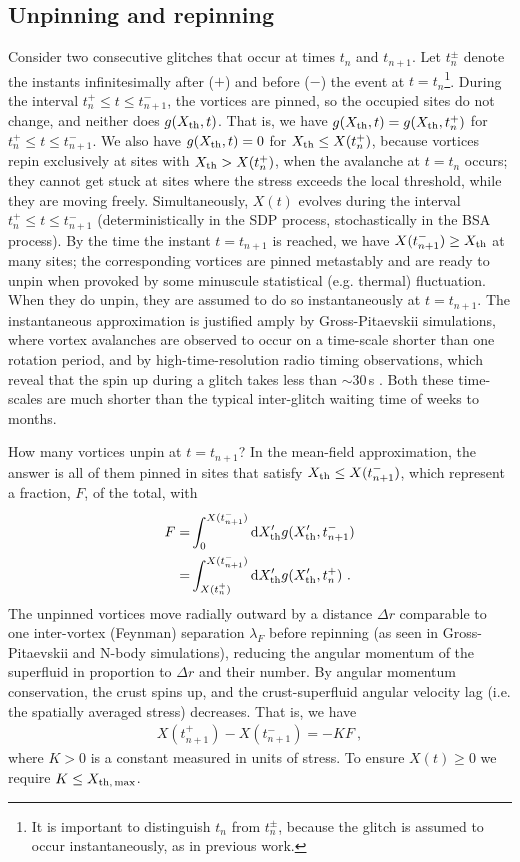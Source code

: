 \subsection{Unpinning and repinning} \label{sec:hda_unpin}
Consider two consecutive glitches that occur at times $t_n$ and $t_{n+1}$. Let $t_n^\pm$ denote the instants infinitesimally after ($+$) and before ($-$) the event at $t = t_n$\footnote{It is important to distinguish $t_n$ from $t_n^\pm$, because the glitch is assumed to occur instantaneously, as in previous work.}. During the interval $t_n^+ \leq t \leq t_{n+1}^-$, the vortices are pinned, so the occupied sites do not change, and neither does $g(X_{\rm th},t)$. That is, we have $g(X_{\rm th}, t) = g(X_{\rm th}, t_n^+)$ for $t_n^+ \leq t \leq t_{n+1}^-$. We also have $g(X_{\rm th}, t) = 0$ for $X_{\rm th} \leq X(t_n^+)$, because vortices repin exclusively at sites with $X_{\rm th} > X(t_n^+)$, when the avalanche at $t = t_n$ occurs; they cannot get stuck at sites where the stress exceeds the local threshold, while they are moving freely. Simultaneously, $X(t)$ evolves during the interval $t_n^+ \leq t \leq t_{n+1}^-$ (deterministically in the SDP process, stochastically in the BSA process). By the time the instant $t = t_{n+1}$ is reached, we have $X(t_{n+1}^-) \geq X_{\rm th}$ at many sites; the corresponding vortices are pinned metastably and are ready to unpin when provoked by some minuscule statistical (e.g. thermal) fluctuation. When they do unpin, they are assumed to do so instantaneously at $t = t_{n+1}$. The instantaneous approximation is justified amply by Gross-Pitaevskii simulations, where vortex avalanches are observed to occur on a time-scale shorter than one rotation period, and by high-time-resolution radio timing observations, which reveal that the spin up during a glitch takes less than $\sim30\,$s \citep{McCulloch1990, Dodson2002, Palfreyman2018, Ashton2019}. Both these time-scales are much shorter than the typical inter-glitch waiting time of weeks to months.

How many vortices unpin at $t=t_{n+1}$? In the mean-field approximation, the answer is all of them pinned in sites that satisfy $X_{\rm th} \leq X(t_{n+1}^-)$, which represent a fraction, $F$, of the total, with 
\begin{align}
F =& \int_0^{X(t_{n+1}^-)} \textrm{d} X_{\rm th}' g(X_{\rm th}', t_{n+1}^-) \\
  =& \int_{X(t_n^+)}^{X(t_{n+1}^-)} \textrm{d} X_{\rm th}' g(X_{\rm th}', t_{n}^+)\ . \label{eq:hda_f}
\end{align}
The unpinned vortices move radially outward by a distance $\Delta r$ comparable to one inter-vortex (Feynman) separation $\lambda_F$ before repinning (as seen in Gross-Pitaevskii and N-body simulations), reducing the angular momentum of the superfluid in proportion to $\Delta r$ and their number. By angular momentum conservation, the crust spins up, and the crust-superfluid angular velocity lag (i.e. the spatially averaged stress) decreases. That is, we have
\begin{align}
X(t_{n+1}^+) - X(t_{n+1}^-) = -KF\ , \label{eq:hda_delx}
\end{align}
where $K > 0$ is a constant measured in units of stress. To ensure $X(t) \geq 0$ we require $K \leq X_{\rm th,\,max}$. 

